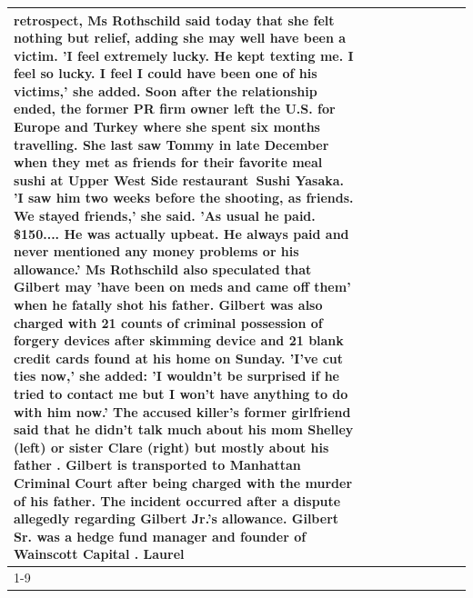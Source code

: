 \begin{table}[H]
\begin{tabular}{lllrlllll}
retrospect, Ms Rothschild said today that she felt nothing but relief, adding she may well have been a victim. 'I feel extremely lucky. He kept texting me. I feel so lucky. I feel I could have been one of his victims,' she added. Soon after the relationship ended, the former PR firm owner left the U.S. for Europe and Turkey where she spent six months  travelling. She last saw Tommy in late December when they met as friends for their favorite meal sushi at Upper West Side restaurant Sushi Yasaka. 'I saw him two weeks before the shooting, as friends. We stayed friends,' she said. 'As usual he paid. \$150.... He was actually upbeat. He always paid and never mentioned any money problems or his allowance.' Ms Rothschild also speculated that Gilbert may 'have been on meds and came off them' when he fatally shot his father. Gilbert was also charged with 21 counts of criminal possession of forgery devices after skimming device and 21 blank credit cards found at his home on Sunday. 'I've cut ties now,' she added: 'I wouldn’t be surprised if he tried to contact me but I won’t have anything to do with him now.' The accused killer's former girlfriend said that he didn't talk much about his mom Shelley (left) or sister Clare (right) but mostly about his father . Gilbert is transported to Manhattan Criminal Court  after being charged with the murder of his father. The incident occurred after a dispute allegedly regarding Gilbert Jr.'s allowance. Gilbert Sr. was a hedge fund manager and founder of Wainscott Capital . Laurel \\
\cline{1-9} \cline{2-9}

\end{tabular}
\end{table}
